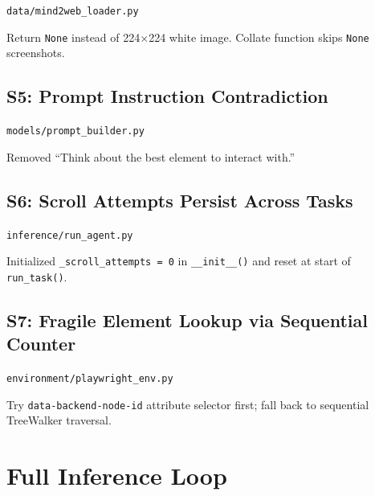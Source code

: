 \documentclass[11pt,a4paper]{article}
\begin{document}
\begin{description}[leftmargin=2cm,style=nextline]
\item[File] \texttt{data/mind2web\_loader.py}
\item[Fix]
  Return \texttt{None} instead of 224$\times$224 white image. Collate
  function skips \texttt{None} screenshots.
\end{description}

\subsection{S5: Prompt Instruction Contradiction}

\begin{description}[leftmargin=2cm,style=nextline]
\item[File] \texttt{models/prompt\_builder.py}
\item[Fix]
  Removed ``Think about the best element to interact with.''
\end{description}

\subsection{S6: Scroll Attempts Persist Across Tasks}

\begin{description}[leftmargin=2cm,style=nextline]
\item[File] \texttt{inference/run\_agent.py}
\item[Fix]
  Initialized \texttt{\_scroll\_attempts = 0} in \texttt{\_\_init\_\_()}
  and reset at start of \texttt{run\_task()}.
\end{description}

\subsection{S7: Fragile Element Lookup via Sequential Counter}

\begin{description}[leftmargin=2cm,style=nextline]
\item[File] \texttt{environment/playwright\_env.py}
\item[Fix]
  Try \texttt{data-backend-node-id} attribute selector first; fall back
  to sequential TreeWalker traversal.
\end{description}


\section{Full Inference Loop}
\end{document}
